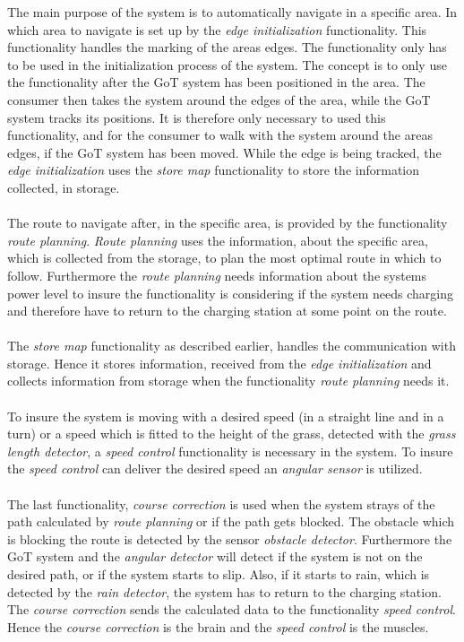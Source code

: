\noindent
The main purpose of the system is to automatically navigate in a specific area. In which area to navigate is set up by the \textit{edge initialization} functionality. This functionality handles the marking of the areas edges. The functionality only has to be used in the initialization process of the system. The concept is to only use the functionality after the GoT system has been positioned in the area. The consumer then takes the system around the edges of the area, while the GoT system tracks its positions. It is therefore only necessary to used this functionality, and for the consumer to walk with the system around the areas edges, if the GoT system has been moved. While the edge is being tracked, the \textit{edge initialization} uses the \textit{store map} functionality to store the information collected, in storage. \\\\ 
\noindent
The route to navigate after, in the specific area, is provided by the functionality \textit{route planning}. \textit{Route planning} uses the information, about the specific area, which is collected from the storage, to plan the most optimal route in which to follow. Furthermore the \textit{route planning} needs information about the systems power level to insure the functionality is considering if the system needs charging and therefore have to return to the charging station at some point on the route.\\\\
\noindent
The \textit{store map} functionality as described earlier, handles the communication with storage. Hence it stores information, received from the \textit{edge initialization} and collects information from storage when the functionality \textit{route planning} needs it. \\\\
\noindent
To insure the system is moving with a desired speed (in a straight line and in a turn) or a speed which is fitted to the height of the grass, detected with the \textit{grass length detector}, a \textit{speed control} functionality is necessary in the system. To insure the \textit{speed control} can deliver the desired speed an \textit{angular sensor} is utilized. \\\\
\noindent
The last functionality, \textit{course correction} is used when the system strays of the path calculated by \textit{route planning} or if the path gets blocked.
The obstacle which is blocking the route is detected by the sensor \textit{obstacle detector}. Furthermore the GoT system and the \textit{angular detector} will detect if the system is not on the desired path, or if the system starts to slip. Also, if it starts to rain, which is detected by the \textit{rain detector}, the system has to return to the charging station.
The \textit{course correction} sends the calculated data to the functionality \textit{speed control}. Hence the \textit{course correction} is the brain and the \textit{speed control} is the muscles.\\\\

